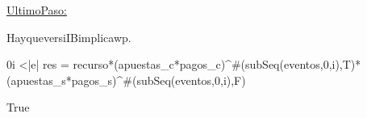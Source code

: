 \underline{UltimoPaso:}

{Hay\hspace{3}que\hspace{3}ver\hspace{3}si\hspace{3}I\wedge B\hspace{3}implica\hspace{3}wp.}
\vspace{0.6cm}

 0\leq i <|e| \wedge res = recurso*(apuestas_c*pagos_c)^{\#(subSeq(eventos,0,i),T)}*(apuestas_s*pagos_s)^{\#(subSeq(eventos,0,i),F)}
 \vspace{0.2cm}

\equiv True
\vspace{0.4cm}





